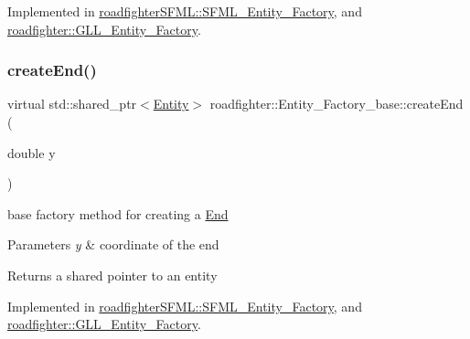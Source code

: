 Implemented in \hyperlink{classroadfighterSFML_1_1SFML__Entity__Factory_aa8da7f42177db63a837596100c21dc88}{roadfighter\+S\+F\+M\+L\+::\+S\+F\+M\+L\+\_\+\+Entity\+\_\+\+Factory}, and \hyperlink{classroadfighter_1_1GLL__Entity__Factory_a7fcd57b8a2ae18240476f6dc64216822}{roadfighter\+::\+G\+L\+L\+\_\+\+Entity\+\_\+\+Factory}.

\mbox{\label{classroadfighter_1_1Entity__Factory__base_a791574991ccbe7ff95f28e5651ed2cb1}} 
\subsubsection{\texorpdfstring{create\+End()}{createEnd()}}
{\footnotesize\ttfamily virtual std\+::shared\+\_\+ptr$<$\hyperlink{classroadfighter_1_1Entity}{Entity}$>$ roadfighter\+::\+Entity\+\_\+\+Factory\+\_\+base\+::create\+End (\begin{DoxyParamCaption}\item[{double}]{y }\end{DoxyParamCaption})\hspace{0.3cm}{\ttfamily [pure virtual]}}

base factory method for creating a \hyperlink{classroadfighter_1_1End}{End} 
\begin{DoxyParams}{Parameters}
{\em y} & coordinate of the end \\
\hline
\end{DoxyParams}
\begin{DoxyReturn}{Returns}
a shared pointer to an entity 
\end{DoxyReturn}


Implemented in \hyperlink{classroadfighterSFML_1_1SFML__Entity__Factory_ac7136d6a99235606f220508719535e08}{roadfighter\+S\+F\+M\+L\+::\+S\+F\+M\+L\+\_\+\+Entity\+\_\+\+Factory}, and \hyperlink{classroadfighter_1_1GLL__Entity__Factory_ae26222829d8295cef0aa708a7ee909b7}{roadfighter\+::\+G\+L\+L\+\_\+\+Entity\+\_\+\+Factory}.

\mbox{\label{classroadfighter_1_1Entity__Factory__base_a3021f69b62b9df33706096381664d58f}} 
